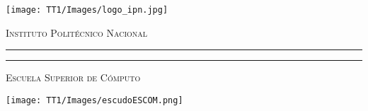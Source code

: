 \documentclass[letter]{letter}
\begin{document}
	
	\thispagestyle{empty}
	
	\begin{minipage}[c][0.1\textheight][c]{0.2\textwidth}
		\begin{center}
			\texttt{[image: TT1/Images/logo\_ipn.jpg]}
		\end{center}
	\end{minipage}
	\begin{minipage}[c][0.1\textheight][t]{0.6\textwidth}
		\begin{center}
			{\scshape {\Large Instituto Polit\'ecnico Nacional}}
			\vspace{.3cm}
			\hrule height2.5pt
			\vspace{.1cm}
			\hrule height1pt
			\vspace{.3cm}
			{\scshape  {\large Escuela Superior de C\'omputo} }
		\end{center}
	\end{minipage}
	\begin{minipage}[c][0.1\textheight][c]{0.2\textwidth}
			\begin{center}
				\texttt{[image: TT1/Images/escudoESCOM.png]}
			\end{center}
	\end{minipage}
	
	\vspace{1cm}
	
\end{document}
